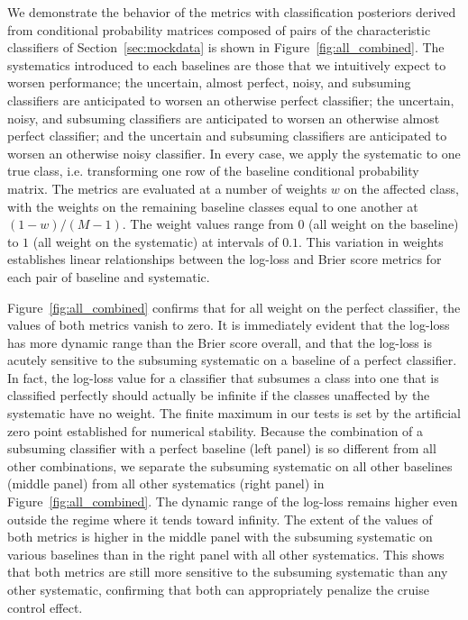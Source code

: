 We demonstrate the behavior of the metrics with classification posteriors derived from conditional probability matrices composed of pairs of the characteristic classifiers of Section~\ref{sec:mockdata} is shown in Figure~\ref{fig:all_combined}.
The systematics introduced to each baselines are those that we intuitively expect to worsen performance;
the uncertain, almost perfect, noisy, and subsuming classifiers are anticipated to worsen an otherwise perfect classifier;
the uncertain, noisy, and subsuming classifiers are anticipated to worsen an otherwise almost perfect classifier;
and the uncertain and subsuming classifiers are anticipated to worsen an otherwise noisy classifier.
In every case, we apply the systematic to one true class, i.e. transforming one row of the baseline conditional probability matrix.
The metrics are evaluated at a number of weights $w$ on the affected class, with the weights on the remaining baseline classes equal to one another at $(1 - w) / (M - 1)$.
The weight values range from $0$ (all weight on the baseline) to $1$ (all weight on the systematic) at intervals of $0.1$.
This variation in weights establishes linear relationships between the log-loss and Brier score metrics for each pair of baseline and systematic.

Figure~\ref{fig:all_combined} confirms that for all weight on the perfect classifier, the values of both metrics vanish to zero.
It is immediately evident that the log-loss has more dynamic range than the Brier score overall, and that the log-loss is acutely sensitive to the subsuming systematic on a baseline of a perfect classifier.
In fact, the log-loss value for a classifier that subsumes a class into one that is classified perfectly should actually be infinite if the classes unaffected by the systematic have no weight.
The finite maximum in our tests is set by the artificial zero point established for numerical stability.
Because the combination of a subsuming classifier with a perfect baseline (left panel) is so different from all other combinations, we separate the subsuming systematic on all other baselines (middle panel) from all other systematics (right panel) in Figure~\ref{fig:all_combined}.
The dynamic range of the log-loss remains higher even outside the regime where it tends toward infinity.
The extent of the values of both metrics is higher in the middle panel with the subsuming systematic on various baselines than in the right panel with all other systematics.
This shows that both metrics are still more sensitive to the subsuming systematic than any other systematic, confirming that both can appropriately penalize the cruise control effect.

